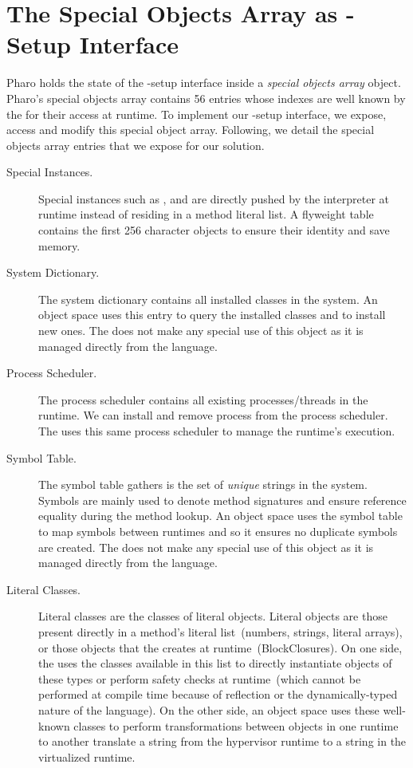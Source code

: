 \section{The Special Objects Array as \VM-Setup Interface}\label{sec:setup_interface}

Pharo \VM holds the state of the \VM-setup interface inside a \emph{special objects array} object. Pharo's special objects array contains 56 entries whose indexes are well known by the \VM for their access at runtime. To implement our \VM-setup interface, we expose, access and modify this special object array. Following, we detail the special objects array entries that we expose for our solution.

\begin{description}
\item[Special Instances.] Special instances such as ,  and  are directly pushed by the \VM interpreter at runtime instead of residing in a method literal list. A flyweight  table contains the first 256 character objects to ensure their identity and save memory.

\item[System Dictionary.] The system dictionary contains all installed classes in the system. An object space uses this entry to query the installed classes and to install new ones. The \VM does not make any special use of this object as it is managed directly from the language.

\item[Process Scheduler.] The process scheduler contains all existing processes/threads in the runtime. We can install and remove process from the process scheduler. The \VM uses this same process scheduler to manage the runtime's execution.

\item[Symbol Table.] The symbol table gathers is the set of \emph{unique} strings in the system. Symbols are mainly used to denote method signatures and ensure reference equality during the method lookup. An object space uses the symbol table to map symbols between runtimes and so it ensures no duplicate symbols are created. The \VM does not make any special use of this object as it is managed directly from the language.

\item[Literal Classes.] Literal classes are the classes of literal objects. Literal objects are those present directly in a method's literal list~(\eg numbers, strings, literal arrays), or those objects that the \VM creates at runtime~(\eg BlockClosures). On one side, the \VM uses the classes available in this list to directly instantiate objects of these types or perform safety checks at runtime~(which cannot be performed at compile time because of reflection or the dynamically-typed nature of the language). On the other side, an object space uses these well-known classes to perform transformations between objects in one runtime to another \eg translate a string from the hypervisor runtime to a string in the virtualized runtime.


\end{description}
